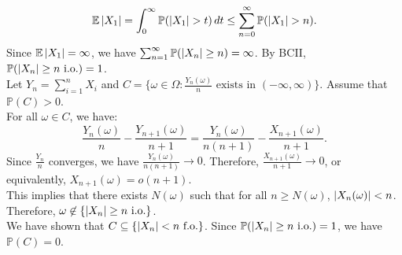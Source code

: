 \documentclass{huhtakm-template-book-v2}
\newcommand{\prob}{\mathbb{P}}
\newcommand{\expect}{\mathbb{E}}
\begin{document}
    \begin{proofing}
        \begin{equation*}
            \expect\abs{X_{1}} = \int_{0}^{\infty}\prob(\abs{X_{1}} > t)\,dt \leq \sum_{n = 0}^{\infty}\prob(\abs{X_{1}} > n).
        \end{equation*}
        Since $\expect\abs{X_{1}} = \infty$, we have $\sum_{n = 1}^{\infty}\prob(\abs{X_{n}} \geq n) = \infty$. By BCII, $\prob(\abs{X_{n}} \geq n\text{ i.o.}) = 1$.\\
        Let $Y_{n} = \sum_{i = 1}^{n}X_{i}$ and $C = \{\omega \in \Omega:\frac{Y_{n}(\omega)}{n}\text{ exists in }(-\infty,\infty)\}$. Assume that $\prob(C) > 0$.\\
        For all $\omega \in C$, we have:
        \begin{equation*}
            \frac{Y_{n}(\omega)}{n}-\frac{Y_{n+1}(\omega)}{n+1} = \frac{Y_{n}(\omega)}{n(n+1)}-\frac{X_{n+1}(\omega)}{n+1}.
        \end{equation*}
        Since $\frac{Y_{n}}{n}$ converges, we have $\frac{Y_{n}(\omega)}{n(n+1)} \to 0$. Therefore, $\frac{X_{n+1}(\omega)}{n+1} \to 0$, or equivalently, $X_{n+1}(\omega) = o(n+1)$.\\
        This implies that there exists $N(\omega)$ such that for all $n \geq N(\omega)$, $\left|{X_{n}(\omega)}\right| < n$. Therefore, $\omega \not \in \{\left|{X_{n}}\right| \geq n\text{ i.o.}\}$.\\
        We have shown that $C\subseteq\{\left|{X_{n}}\right| < n\text{ f.o.}\}$. Since $\prob(\abs{X_{n}} \geq n\text{ i.o.}) = 1$, we have $\prob(C) = 0$.
    \end{proofing}
    \newpage
\end{document}
